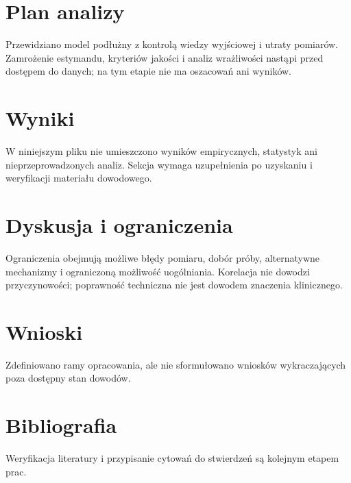 \documentclass[11pt,a4paper]{article}
\begin{document}
\section{Plan analizy}

Przewidziano model podłużny z kontrolą wiedzy wyjściowej i utraty pomiarów. Zamrożenie estymandu, kryteriów jakości i analiz wrażliwości nastąpi przed dostępem do danych; na tym etapie nie ma oszacowań ani wyników.

\section{Wyniki}

W niniejszym pliku nie umieszczono wyników empirycznych, statystyk ani nieprzeprowadzonych analiz. Sekcja wymaga uzupełnienia po uzyskaniu i weryfikacji materiału dowodowego.

\section{Dyskusja i ograniczenia}

Ograniczenia obejmują możliwe błędy pomiaru, dobór próby, alternatywne mechanizmy i ograniczoną możliwość uogólniania. Korelacja nie dowodzi przyczynowości; poprawność techniczna nie jest dowodem znaczenia klinicznego.

\section{Wnioski}

Zdefiniowano ramy opracowania, ale nie sformułowano wniosków wykraczających poza dostępny stan dowodów.

\section*{Bibliografia}

Weryfikacja literatury i przypisanie cytowań do stwierdzeń są kolejnym etapem prac.
\end{document}
